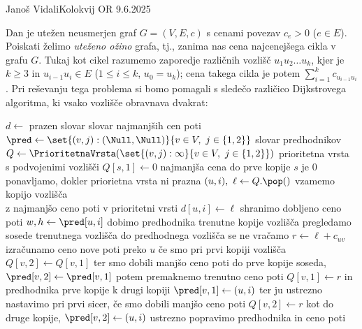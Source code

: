 \begin{naloga}{Janoš Vidali}{Kolokvij OR 9.6.2025}
\begin{vprasanje}
Dan je utežen neusmerjen graf $G = (V, E, c)$
s cenami povezav $c_e > 0$ ($e \in E$).
Poiskati želimo {\em uteženo ožino} grafa,
tj., zanima nas cena najcenejšega cikla v grafu $G$.
Tukaj kot cikel razumemo zaporedje različnih vozlišč $u_1 u_2 \dots u_k$,
kjer je $k \ge 3$ in $u_{i-1} u_i \in E$ ($1 \le i \le k$, $u_0 = u_k$);
cena takega cikla je potem $\sum_{i=1}^k c_{u_{i-1} u_i}$.
Pri reševanju tega problema
si bomo pomagali s sledečo različico Dijkstrovega algoritma,
ki vsako vozlišče obravnava dvakrat:
\begin{small}
\begin{algorithmic}
	\State $d \gets$ prazen slovar \hfill slovar najmanjših cen poti
	\State $\pred \gets \set{(v, j): (\Null, \Null)}{v \in V, \ j \in \{1, 2\}}$
	\hfill slovar predhodnikov
	\State $Q \gets \PrioritetnaVrsta(\set{(v, j): \infty}{v \in V, \ j \in \{1, 2\}})$
	\hfill prioritetna vrsta \\ \hfill s podvojenimi vozlišči
	\State $Q[s, 1] \gets 0$ \hfill najmanjša cena do prve kopije $s$ je $0$
	 \hfill ponavljamo, dokler priorietna vrsta ni prazna
		\State $(u, i), \ \ell \gets Q.\pop()$
		\hfill vzamemo kopijo vozlišča \\
		\hfill z najmanjšo ceno poti v prioritetni vrsti
		\State $d[u, i] \gets \ell$ \hfill shranimo dobljeno ceno poti
		\State $w, h \gets \pred[u, i]$
		\hfill dobimo predhodnika trenutne kopije vozlišča
		 \hfill pregledamo sosede trenutnega vozlišča
			 \hfill do predhodnega vozlišča se ne vračamo
			\EndIf
			\State $r \gets \ell + c_{uv}$
			\hfill izračunamo ceno nove poti preko $u$
				\hfill če smo pri prvi kopiji vozlišča
				\State $Q[v, 2] \gets Q[v, 1]$
				\hfill ter smo dobili manjšo ceno poti do prve kopije soseda,
				\State $\pred[v, 2] \gets \pred[v, 1]$
				\hfill potem premaknemo trenutno ceno poti
				\State $Q[v, 1] \gets r$
				\hfill in predhodnika prve kopije k drugi kopiji
				\State $\pred[v, 1] \gets (u, i)$
				\hfill ter ju ustrezno nastavimo pri prvi
			\hfill sicer, če smo dobili manjšo ceno poti
				\State $Q[v, 2] \gets r$
				\hfill kot do druge kopije,
				\State $\pred[v, 2] \gets (u, i)$
				\hfill ustrezno popravimo predhodnika in ceno poti

\end{algorithmic}
\end{small}
\end{vprasanje}
\end{naloga}
